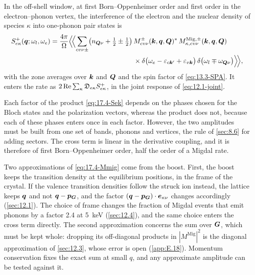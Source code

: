 \begin{keyresult}
In the off-shell window, at first Born--Oppenheimer order and first order in the electron--phonon vertex, the interference of the electron and the nuclear density of species $\kappa$ into one-phonon pair states is
\begin{equation}
  \begin{split}
  S^+_{e\kappa}(\bm{q};\omega_l,\omega_e) = \frac{4\pi}{\Omega}\Bigl\langle\!\Bigl\langle\sum_{cv\nu\pm}\bigl(n_{\bm{Q}\nu} + \tfrac12 \pm \tfrac12\bigr)\,
  &M^{\pm}_{cv\nu}(\bm{k},\bm{q},\bm{Q})^*\,M^{\mathrm{Mig},\pm}_{\kappa,cv\nu}(\bm{k},\bm{q},\bm{Q}) \\
  &\times\delta\bigl(\omega_e - \varepsilon_{c\bm{k}'} + \varepsilon_{v\bm{k}}\bigr)\,\delta\bigl(\omega_l \mp \omega_{\bm{Q}\nu}\bigr)\Bigr\rangle\!\Bigr\rangle ,
  \end{split}
  \label{eq:17.4-Sek}
\end{equation}
with the zone averages over $\bm{k}$ and $\bm{Q}$ and the spin factor of \cref{eq:13.3-SPA}. It enters the rate as $2\operatorname{Re}\sum_\kappa\mathfrak{D}_{e\kappa}S^+_{e\kappa}$, in the joint response of \cref{eq:12.1-joint}.
\end{keyresult}
\noindent Each factor of the product \cref{eq:17.4-Sek} depends on the phases chosen for the Bloch states and the polarization vectors, whereas the product does not, because each of these phases enters once in each factor. However, the two amplitudes must be built from one set of bands, phonons and vertices, the rule of \cref{sec:8.6} for adding sectors. The cross term is linear in the derivative coupling, and it is therefore of first Born--Oppenheimer order, half the order of a Migdal rate.

Two approximations of \cref{eq:17.4-Mmig} come from the boost. First, the boost keeps the transition density at the equilibrium positions, in the frame of the crystal. If the valence transition densities follow the struck ion instead, the lattice keeps $\bm{q}$ and not $\bm{q} - \bm{p}_{\bm{G}}$, and the factor $(\bm{q} - \bm{p}_{\bm{G}})\cdot\bm{e}_{\kappa\nu}$ changes accordingly (\cref{sec:12.1}). The choice of frame changes the fraction of Migdal events that emit phonons by a factor 2.4 at \SI{5}{keV} (\cref{sec:12.4}), and the same choice enters the cross term directly. The second approximation concerns the sum over $\bm{G}$, which must be kept whole: dropping its off-diagonal products in $|M^{\mathrm{Mig}}|^2$ is the diagonal approximation of \cref{sec:12.3}, whose error is open (\cref{app:E.18}). Momentum conservation fixes the exact sum at small $q$, and any approximate amplitude can be tested against it.


